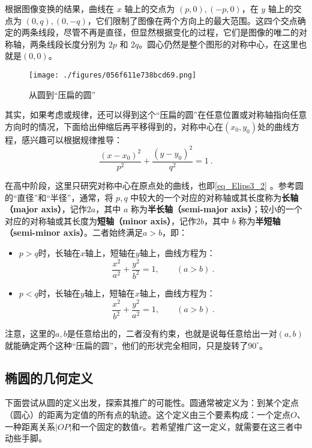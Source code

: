 根据图像变换的结果，曲线在 $x$ 轴上的交点为 $(p, 0), (-p, 0)$，在 $y$ 轴上的交点为 $(0, q), (0, -q)$，它们限制了图像在两个方向上的最大范围。这四个交点确定的两条线段，尽管不再是直径，但显然根据变化的过程，它们是图像的唯二的对称轴，两条线段长度分别为 $2p$ 和 $2q$。圆心仍然是整个图形的对称中心，在这里也就是$(0,0)$。

\begin{figure}[ht]
\centering
\texttt{[image: ./figures/056f611e738bcd69.png]}
\caption{从圆到“压扁的圆”} \label{fig_Elips3_1}
\end{figure}

其实，如果考虑或规律，还可以得到这个“压扁的圆”在任意位置或对称轴指向任意方向时的情况，下面给出伸缩后再平移得到的，对称中心在$(x_0,y_0)$处的曲线方程，感兴趣可以根据规律推导：
\begin{equation}
\frac{(x-x_0)^2}{p^2} + \frac{(y-y_0)^2}{q^2} = 1~.
\end{equation}

在高中阶段，这里只研究对称中心在原点处的曲线，也即\autoref{eq_Elips3_2} 。参考圆的“直径”和“半径”，通常，将 $p, q$ 中较大的一个对应的对称轴或其长度称为\textbf{长轴（major axis）}，记作$2a$，其中 $a$ 称为\textbf{半长轴（semi-major axis）}；较小的一个对应的对称轴或其长度为\textbf{短轴（minor axis）}，记作$2b$，其中 $b$ 称为\textbf{半短轴（semi-minor axis）}。二者始终满足$a>b$，即：
\begin{itemize}
\item $p>q$时，长轴在$x$轴上，短轴在$y$轴上，曲线方程为：
\begin{equation}\label{eq_Elips3_5}
\frac{x^2}{a^2} + \frac{y^2}{b^2} = 1,\qquad(a>b)~.
\end{equation}
\item $p<q$时，长轴在$y$轴上，短轴在$x$轴上，曲线方程为：
\begin{equation}\label{eq_Elips3_7}
\frac{x^2}{b^2} + \frac{y^2}{a^2} = 1,\qquad(a>b)~.
\end{equation}
\end{itemize}

注意，这里的$a,b$是任意给出的，二者没有约束，也就是说每任意给出一对$(a,b)$就能确定两个这种“压扁的圆”，他们的形状完全相同，只是旋转了$90^\circ$。

\subsection{椭圆的几何定义}\label{sub_Elips3_2}

下面尝试从圆的定义出发，探索其推广的可能性。圆通常被定义为：到某个定点（圆心）的距离为定值的所有点的轨迹。这个定义由三个要素构成：一个定点$O$、一种距离关系$|OP|$和一个固定的数值$r$。若希望推广这一定义，就需要在这三者中动些手脚。

